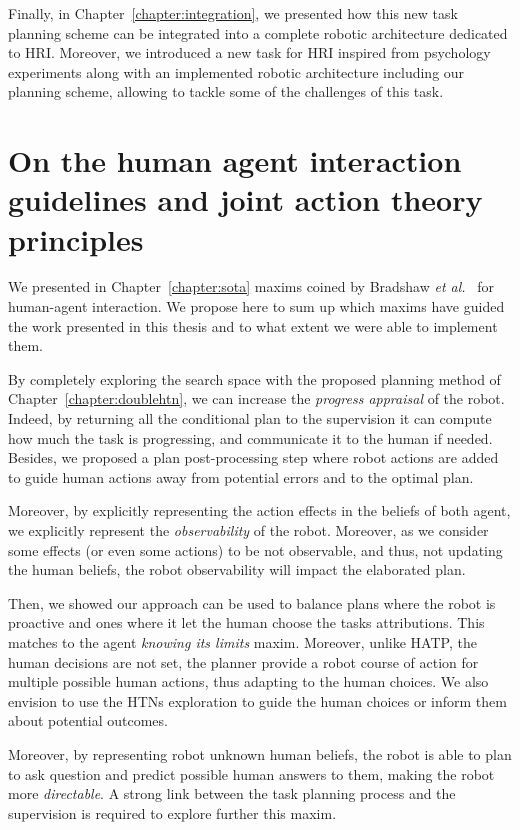 \documentclass[a4paper,11pt,twoside]{StyleThese}
\begin{document}
Finally, in Chapter~\ref{chapter:integration}, we presented how this new task planning scheme can be integrated into a complete robotic architecture dedicated to HRI. Moreover, we introduced a new task for HRI inspired from psychology experiments along with an implemented robotic architecture including our planning scheme, allowing to tackle some of the challenges of this task.

\section*{On the human agent interaction guidelines and joint action theory principles}
We presented in Chapter~\ref{chapter:sota} maxims coined by Bradshaw \textit{et al.}~\cite{bradshaw2011human} for human-agent interaction. We propose here to sum up which maxims have guided the work presented in this thesis and to what extent we were able to implement them.

By completely exploring the search space with the proposed planning method of Chapter~\ref{chapter:doublehtn}, we can increase the \textit{progress appraisal} of the robot. Indeed, by returning all the conditional plan to the supervision it can compute how much the task is progressing, and communicate it to the human if needed. Besides, we proposed a plan post-processing step where robot actions are added to guide human actions away from potential errors and to the optimal plan.

Moreover, by explicitly representing the action effects in the beliefs of both agent, we explicitly represent the \textit{observability} of the robot. Moreover, as we consider some effects (or even some actions) to be not observable, and thus, not updating the human beliefs, the robot observability will impact the elaborated plan.

Then, we showed our approach can be used to balance plans where the robot is proactive and ones where it let the human choose the tasks attributions. This matches to the agent \textit{knowing its limits} maxim. Moreover, unlike HATP, the human decisions are not set, the planner provide a robot course of action for multiple possible human actions, thus adapting to the human choices. We also envision to use the HTNs exploration to guide the human choices or inform them about potential outcomes.

Moreover, by representing robot unknown human beliefs, the robot is able to plan to ask question and predict possible human answers to them, making the robot more \textit{directable}. A strong link between the task planning process and the supervision is required to explore further this maxim.
\end{document}
